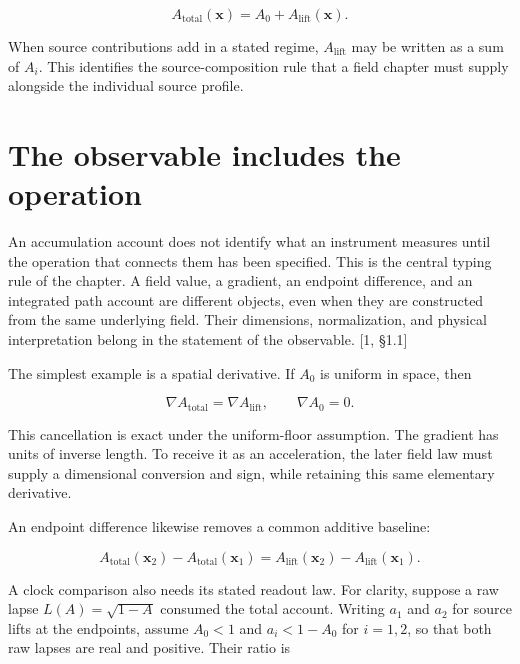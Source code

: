 \documentclass[10pt,twocolumn,letterpaper]{article}
\begin{document}
\begin{equation}
A_{\mathrm{total}}(\mathbf x)
=A_0+A_{\mathrm{lift}}(\mathbf x).
\end{equation}

When source contributions add in a stated regime, \(A_{\mathrm{lift}}\) may be written as a sum of \(A_i\). This identifies the source-composition rule that a field chapter must supply alongside the individual source profile.

\section{The observable includes the operation}\label{the-observable-includes-the-operation}

An accumulation account does not identify what an instrument measures until the operation that connects them has been specified. This is the central typing rule of the chapter. A field value, a gradient, an endpoint difference, and an integrated path account are different objects, even when they are constructed from the same underlying field. Their dimensions, normalization, and physical interpretation belong in the statement of the observable. {[}1, §1.1{]}

The simplest example is a spatial derivative. If \(A_0\) is uniform in space, then

\begin{equation}
\nabla A_{\mathrm{total}}
=\nabla A_{\mathrm{lift}},
\qquad \nabla A_0=0.
\end{equation}

This cancellation is exact under the uniform-floor assumption. The gradient has units of inverse length. To receive it as an acceleration, the later field law must supply a dimensional conversion and sign, while retaining this same elementary derivative.

An endpoint difference likewise removes a common additive baseline:

\begin{equation}
A_{\mathrm{total}}(\mathbf x_2)
-A_{\mathrm{total}}(\mathbf x_1)
=A_{\mathrm{lift}}(\mathbf x_2)
-A_{\mathrm{lift}}(\mathbf x_1).
\end{equation}

A clock comparison also needs its stated readout law. For clarity, suppose a raw lapse \(L(A)=\sqrt{1-A}\) consumed the total account. Writing \(a_1\) and \(a_2\) for source lifts at the endpoints, assume \(A_0<1\) and \(a_i<1-A_0\) for \(i=1,2\), so that both raw lapses are real and positive. Their ratio is
\end{document}
